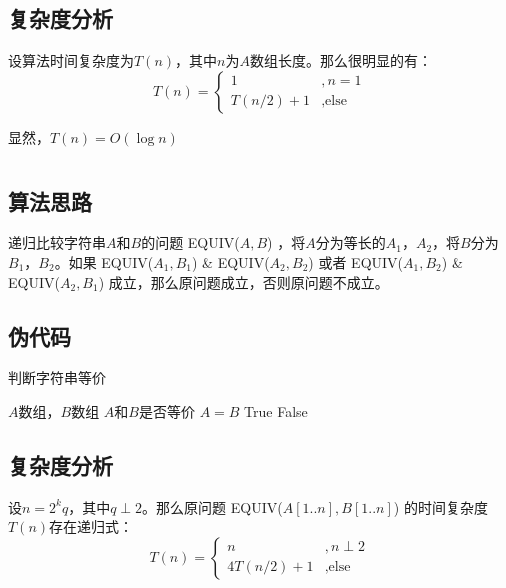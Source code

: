 \documentclass[UTF8]{ctexart}
\begin{document}
\subsection*{复杂度分析}
设算法时间复杂度为$T(n)$，其中$n$为$A$数组长度。那么很明显的有：
\begin{equation*}
    T(n) = 
    \begin{cases}
        1 &, n=1 \\
        T(n/2) + 1 &, \text{else}
    \end{cases}
\end{equation*}

显然，$T(n) = O(\log n)$

\section{}
\subsection*{算法思路}
递归比较字符串$A$和$B$的问题 EQUIV($A, B$) ，将$A$分为等长的$A_1$，$A_2$，将$B$分为$B_1$，$B_2$。如果 EQUIV($A_1, B_1$) \& EQUIV($A_2, B_2$) 或者 EQUIV($A_1, B_2$) \& EQUIV($A_2, B_1$) 成立，那么原问题成立，否则原问题不成立。

\subsection*{伪代码}
\begin{algorithm}
    \caption{判断字符串等价}
    \begin{algorithmic}[1]
        \Require $A$数组，$B$数组
        \Ensure $A$和$B$是否等价
                \State \Return $A=B$
            \EndIf
                \State \Return True
            \Else
                \State \Return False
            \EndIf
        \EndFunction
    \end{algorithmic}
\end{algorithm}

\subsection*{复杂度分析}
设$n=2^kq$，其中$q\perp 2$。那么原问题 EQUIV($A[1..n], B[1..n]$) 的时间复杂度$T(n)$存在递归式：
\begin{equation*}
    T(n) = 
    \begin{cases}
        n &, n\perp 2 \\
        4T(n/2) + 1 &, \text{else}
    \end{cases}
\end{equation*}
\end{document}

